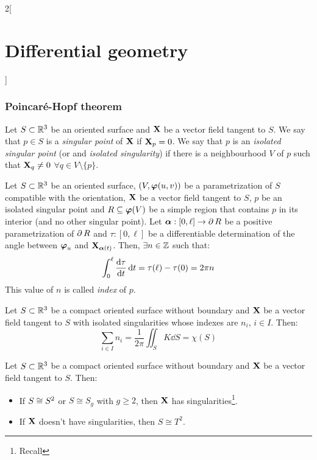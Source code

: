 \documentclass[../../../main_math.tex]{subfiles}
\begin{document}
\begin{multicols}{2}[\section{Differential geometry}]
  \subsubsection{Poincaré-Hopf theorem}
  \begin{definition}
    Let $S\subset\RR^3$ be an oriented surface and $\vf{X}$ be a vector field tangent to $S$. We say that $p\in S$ is a \emph{singular point} of $\vf{X}$ if $\vf{X}_p=0$. We say that $p$ is an \emph{isolated singular point} (or and \emph{isolated singularity}) if there is a neighbourhood $V$ of $p$ such that $\vf{X}_q\ne 0$ $\forall q\in V\setminus\{p\}$.
  \end{definition}
  \begin{proposition}
    Let $S\subset\RR^3$ be an oriented surface, $(V,\vf\varphi(u,v))$ be a parametrization of $S$ compatible with the orientation, $\vf{X}$ be a vector field tangent to $S$, $p$ be an isolated singular point and $R\subseteq \vf\varphi(V)$ be a simple region that contains $p$ in its interior (and no other singular point). Let $\vf\alpha:[0,\ell]\rightarrow\Fr{R}$ be a positive parametrization of $\Fr{R}$ and $\tau:[0,\ell]$ be a differentiable determination of the angle between $\vf\varphi_u$ and $\vf{X}_{\vf\alpha(t)}$. Then, $\exists n\in\ZZ$ such that: $$\int_0^\ell\dv{\tau}{t}\dd{t}=\tau(\ell)-\tau(0)=2\pi n$$
    This value of $n$ is called \emph{index} of $p$.
  \end{proposition}
  \begin{theorem}
    Let $S\subset\RR^3$ be a compact oriented surface without boundary and $\vf{X}$ be a vector field tangent to $S$ with isolated singularities whose indexes are $n_i$, $i\in I$. Then: $$\sum_{i\in I}n_i=\frac{1}{2\pi}\iint_SK\dd{S}=\chi(S)$$
  \end{theorem}
  \begin{corollary}
    Let $S\subset\RR^3$ be a compact oriented surface without boundary and $\vf{X}$ be a vector field tangent to $S$. Then:
    \begin{itemize}
      \item If $S\cong \S^2$ or $S\cong S_g$ with $g\geq 2$, then $\vf{X}$ has singularities\footnote{Recall }.
      \item If $\vf{X}$ doesn't have singularities, then $S\cong T^2$.
    \end{itemize}
  \end{corollary}
\end{multicols}
\end{document}
